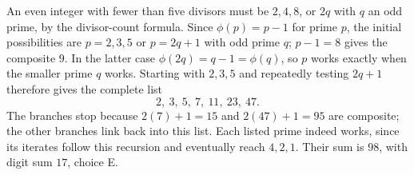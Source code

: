 An even integer with fewer than five divisors must be $2,4,8$, or $2q$ with $q$ an odd prime, by the divisor-count formula. Since $\phi(p)=p-1$ for prime $p$, the initial possibilities are $p=2,3,5$ or $p=2q+1$ with odd prime $q$; $p-1=8$ gives the composite $9$.
In the latter case $\phi(2q)=q-1=\phi(q)$, so $p$ works exactly when the smaller prime $q$ works. Starting with $2,3,5$ and repeatedly testing $2q+1$ therefore gives the complete list
\[2,\ 3,\ 5,\ 7,\ 11,\ 23,\ 47.\]
The branches stop because $2(7)+1=15$ and $2(47)+1=95$ are composite; the other branches link back into this list. Each listed prime indeed works, since its iterates follow this recursion and eventually reach $4,2,1$. Their sum is $98$, with digit sum $\boxed{17}$, choice E.
